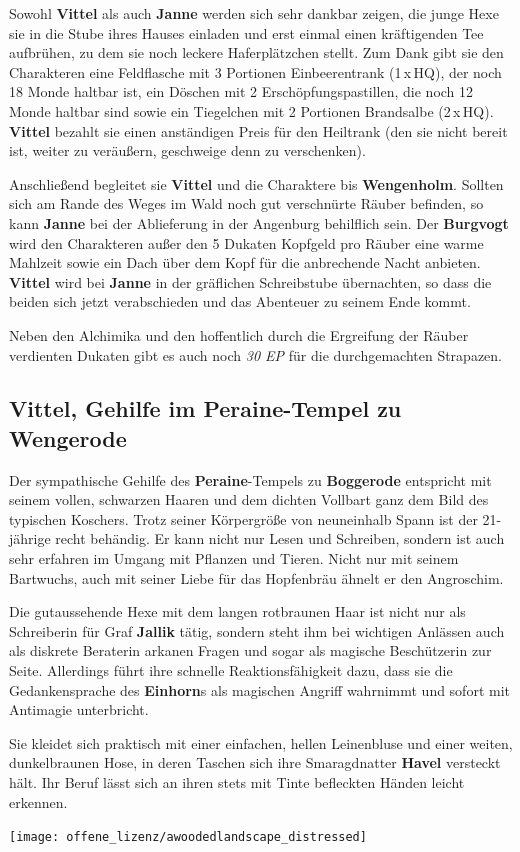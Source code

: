 Sowohl \textbf{Vittel} als auch \textbf{Janne} werden sich sehr dankbar zeigen, die junge Hexe sie in die Stube ihres Hauses einladen und erst einmal einen kräftigenden Tee aufbrühen, zu dem sie noch leckere Haferplätzchen stellt.
Zum Dank gibt sie den Charakteren eine Feldflasche mit 3 Portionen Einbeerentrank (1\,x\,HQ), der noch 18 Monde haltbar ist, ein Döschen mit 2 Erschöpfungspastillen, die noch 12 Monde haltbar sind sowie ein Tiegelchen mit 2 Portionen Brandsalbe (2\,x\,HQ).
\textbf{Vittel} bezahlt sie einen anständigen Preis für den Heiltrank (den sie nicht bereit ist, weiter zu veräußern, geschweige denn zu verschenken).


Anschließend begleitet sie \textbf{Vittel} und die Charaktere bis \textbf{Wengenholm}.
Sollten sich am Rande des Weges im Wald noch gut verschnürte Räuber befinden, so kann \textbf{Janne} bei der Ablieferung in der Angenburg behilflich sein.
Der \textbf{Burgvogt} wird den Charakteren außer den 5 Dukaten Kopfgeld pro Räuber eine warme Mahlzeit sowie ein Dach über dem Kopf für die anbrechende Nacht anbieten.
\textbf{Vittel} wird bei \textbf{Janne} in der gräflichen Schreibstube übernachten, so dass die beiden sich jetzt verabschieden und das Abenteuer zu seinem Ende kommt. 

Neben den Alchimika und den hoffentlich durch die Ergreifung der Räuber verdienten Dukaten gibt es auch noch \textit{30 EP} für die durchgemachten Strapazen.

\neuespalte


\subsection[Vittel, Gehilfe im Peraine-Tempel]{Vittel, Gehilfe im Peraine-Tempel zu Wengerode}
Der sympathische Gehilfe des \textbf{Peraine}-Tempels zu \textbf{Boggerode} entspricht mit seinem vollen, schwarzen Haaren und dem dichten Vollbart ganz dem Bild des typischen Koschers.
Trotz seiner Körpergröße von neuneinhalb Spann ist der 21-jährige recht behändig.
Er kann nicht nur Lesen und Schreiben, sondern ist auch sehr erfahren im Umgang mit Pflanzen und Tieren.
Nicht nur mit seinem Bartwuchs, auch mit seiner Liebe für das Hopfenbräu ähnelt er den Angroschim.


Die gutaussehende Hexe mit dem langen rotbraunen Haar ist nicht nur als Schreiberin für Graf \textbf{Jallik} tätig, sondern steht ihm bei wichtigen Anlässen auch als diskrete Beraterin arkanen Fragen und sogar als magische Beschützerin zur Seite. Allerdings führt ihre schnelle Reaktionsfähigkeit dazu, dass sie die Gedankensprache des \textbf{Einhorn}s als magischen Angriff wahrnimmt und sofort mit Antimagie unterbricht.

Sie kleidet sich praktisch mit einer einfachen, hellen Leinenbluse und einer weiten, dunkelbraunen Hose, in deren Taschen sich ihre Smaragdnatter \textbf{Havel} versteckt hält. Ihr Beruf lässt sich an ihren stets mit Tinte befleckten Händen leicht erkennen.

\spaltenende
\vfill
\texttt{[image: offene\_lizenz/awoodedlandscape\_distressed]}
